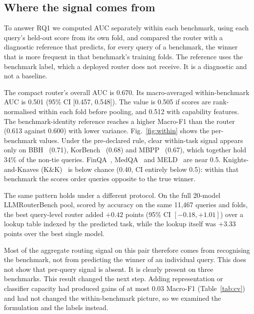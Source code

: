 \documentclass[lettersize,journal]{IEEEtran}
\begin{document}
\subsection{Where the signal comes from}
\label{sec:a-within}
To answer RQ1 we computed AUC separately within each benchmark, using each query's held-out score from its own fold, and compared the router with a diagnostic reference that predicts, for every query of a benchmark, the winner that is more frequent in that benchmark's training folds. The reference uses the benchmark label, which a deployed router does not receive. It is a diagnostic and not a baseline.

The compact router's overall AUC is 0.670. Its macro-averaged within-benchmark AUC is 0.501 (95\% CI [0.457, 0.548]). The value is 0.505 if scores are rank-normalised within each fold before pooling, and 0.512 with capability features. The benchmark-identity reference reaches a higher Macro-F1 than the router (0.613 against 0.600) with lower variance. Fig.~\ref{fig:within} shows the per-benchmark values. Under the pre-declared rule, clear within-task signal appears only on BBH~\cite{bbh} (0.71), KorBench~\cite{korbench} (0.68) and MBPP~\cite{mbpp} (0.67), which together hold 34\% of the non-tie queries. FinQA~\cite{finqa}, MedQA~\cite{medqa} and MELD~\cite{meld} are near 0.5. Knights-and-Knaves (K\&K)~\cite{kandk} is below chance (0.40, CI entirely below 0.5): within that benchmark the scores order queries opposite to the true winner.

The same pattern holds under a different protocol. On the full 20-model LLMRouterBench pool, scored by accuracy on the same 11,467 queries and folds, the best query-level router added $+0.42$ points (95\% CI $[-0.18, +1.01]$) over a lookup table indexed by the predicted task, while the lookup itself was $+3.33$ points over the best single model.

Most of the aggregate routing signal on this pair therefore comes from recognising the benchmark, not from predicting the winner of an individual query. This does not show that per-query signal is absent. It is clearly present on three benchmarks. This result changed the next step. Adding representation or classifier capacity had produced gains of at most 0.03 Macro-F1 (Table~\ref{tab:cv}) and had not changed the within-benchmark picture, so we examined the formulation and the labels instead.
\end{document}
